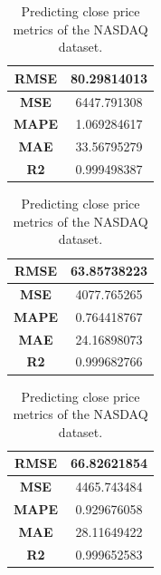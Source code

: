 \begin{table}[H]
	\centering
	\begin{minipage}{0.3\textwidth}
		\centering
		\begin{tabular}{|c|c|}
			\hline
			\textbf{RMSE} & 80.29814013 \\
			\hline
			\textbf{MSE}  & 6447.791308 \\
			\hline
			\textbf{MAPE} & 1.069284617 \\
			\hline
			\textbf{MAE}  & 33.56795279 \\
			\hline
			\textbf{R2}   & 0.999498387 \\
			\hline
		\end{tabular}
	\end{minipage}
	\begin{minipage}{0.3\textwidth}
		\centering
		\begin{tabular}{|c|c|}
			\hline
			\textbf{RMSE} & 63.85738223 \\
			\hline
			\textbf{MSE}  & 4077.765265 \\
			\hline
			\textbf{MAPE} & 0.764418767 \\
			\hline
			\textbf{MAE}  & 24.16898073 \\
			\hline
			\textbf{R2}   & 0.999682766 \\
			\hline
		\end{tabular}
	\end{minipage}
	\begin{minipage}{0.3\textwidth}
		\centering
		\begin{tabular}{|c|c|}
			\hline
			\textbf{RMSE} & 66.82621854 \\
			\hline
			\textbf{MSE}  & 4465.743484 \\
			\hline
			\textbf{MAPE} & 0.929676058 \\
			\hline
			\textbf{MAE}  & 28.11649422 \\
			\hline
			\textbf{R2}   & 0.999652583 \\
			\hline
		\end{tabular}
	\end{minipage}
	\caption{Predicting close price metrics of the NASDAQ dataset.}
	\label{metric:nasdaq_close}
\end{table}
